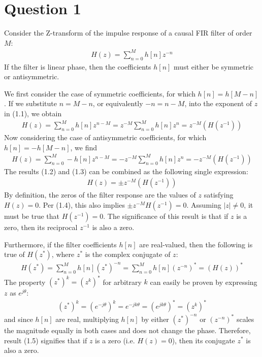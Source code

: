 \section*{Question 1}

Consider the Z-transform of the impulse response of a causal FIR filter of order $M$:
\begin{align}
    H(z) = \sum_{n=0}^{M} h[n] z^{-n}
\end{align}
If the filter is linear phase, then the coefficients $h[n]$ must either be symmetric or antisymmetric.

We first consider the case of symmetric coefficients, for which $h[n]=h[M-n]$. If we substitute $n=M-n$, or equivalently $-n=n-M$, into the exponent of $z$ in (1.1), we obtain
\begin{align}
    H(z) = \sum_{n=0}^{M} h[n] z^{n-M}
         = z^{-M} \sum_{n=0}^{M} h[n] z^n
         = z^{-M} \left(H(z^{-1})\right)
\end{align}
Now considering the case of antisymmetric coefficients, for which $h[n]=-h[M-n]$, we find
\begin{align}
    H(z) = \sum_{n=0}^{M} -h[n] z^{n-M}
         = -z^{-M} \sum_{n=0}^{M} h[n] z^n
         = -z^{-M} \left(H(z^{-1})\right)
\end{align}
The results (1.2) and (1.3) can be combined as the following single expression:
\begin{align}
    H(z) = \pm z^{-M} \left( H(z^{-1}) \right)
\end{align}
By definition, the zeros of the filter response are the values of $z$ satisfying $H(z)=0$. Per (1.4), this also implies $\pm z^{-M} H(z^{-1})=0$. Assuming $|z|\neq 0$, it must be true that $H(z^{-1})=0$. The significance of this result is that if $z$ is a zero, then its reciprocal $z^{-1}$ is also a zero.

Furthermore, if the filter coefficients $h[n]$ are real-valued, then the following is true of $H(z^*)$, where $z^*$ is the complex conjugate of $z$:
\begin{align}
    H(z^*) = \sum_{n=0}^{M} h[n] (z^*)^{-n}
           = \sum_{n=0}^{M} h[n] (z^{-n})^*
           = \left(H(z)\right)^*
\end{align}
The property $(z^*)^k=(z^k)^*$ for arbitrary $k$ can easily be proven by expressing $z$ as $e^{j\theta}$:
\begin{align}
    (z^*)^k = (e^{-j\theta})^k = e^{-jk\theta} = (e^{jk\theta})^* = (z^k)^*
\end{align}
and since $h[n]$ are real, multiplying $h[n]$ by either $(z^*)^{-n}$ or $(z^{-n})^*$ scales the magnitude equally in both cases and does not change the phase. Therefore, result (1.5) signifies that if $z$ is a zero (i.e. $H(z)=0$), then its conjugate $z^*$ is also a zero.

